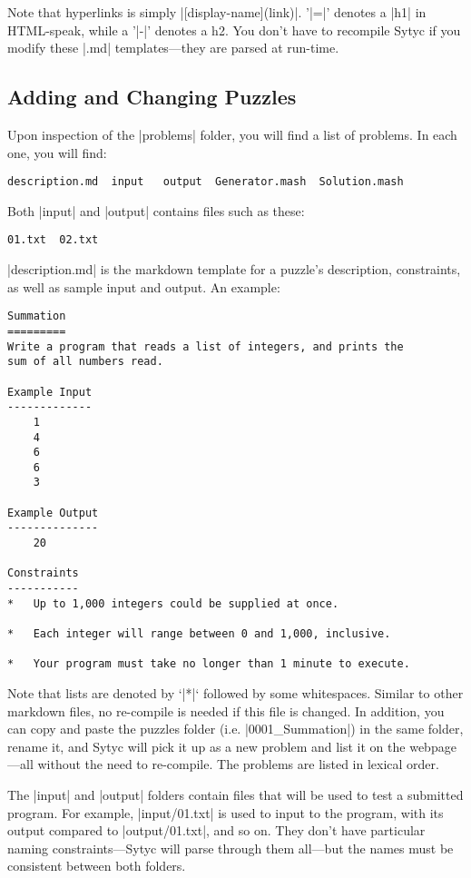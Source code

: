\documentclass[a4paper]{article}
\begin{document}
Note that hyperlinks is simply |[display-name](link)|. '|=|' denotes a |h1| in HTML-speak, while a '|-|' denotes a h2.  You don't have to recompile Sytyc if you modify these |.md| templates---they are parsed at run-time.

\subsection{Adding and Changing Puzzles}

Upon inspection of the |problems| folder, you will find a list of problems.  In each one, you will find:
\begin{verbatim}
description.md  input   output  Generator.mash  Solution.mash
\end{verbatim}

Both |input| and |output| contains files such as these:
\begin{verbatim}
01.txt  02.txt
\end{verbatim}

|description.md| is the markdown template for a puzzle's description, constraints, as well as sample input and output.  An example:
\begin{verbatim}
Summation
=========
Write a program that reads a list of integers, and prints the
sum of all numbers read.

Example Input
-------------
    1
    4
    6
    6
    3

Example Output
--------------
    20
    
Constraints
-----------
*   Up to 1,000 integers could be supplied at once.

*   Each integer will range between 0 and 1,000, inclusive.

*   Your program must take no longer than 1 minute to execute.
\end{verbatim}

Note that lists are denoted by `|*|` followed by some whitespaces.  Similar to other markdown files, no re-compile is needed if this file is changed.  In addition, you can copy and paste the puzzles folder (i.e. |0001_Summation|) in the same folder, rename it, and Sytyc will pick it up as a new problem and list it on the webpage---all without the need to re-compile.  The problems are listed in lexical order.

The |input| and |output| folders contain files that will be used to test a submitted program.  For example, |input/01.txt| is used to input to the program, with its output compared to |output/01.txt|, and so on.  They don't have particular naming constraints---Sytyc will parse through them all---but the names must be consistent between both folders.
\end{document}
